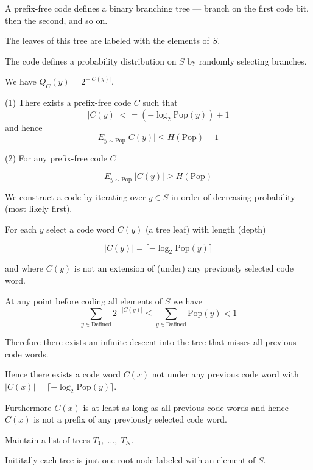 {

A prefix-free code defines a binary branching tree --- branch on the first code bit, then the second, and so on.

\vfill
The leaves of this tree are labeled with the elements of $S$.

\vfill
The code defines a probability distribution on $S$ by randomly selecting branches.

\vfill
We have $Q_C(y) = 2^{-|C(y)|}$.


(1) There exists a prefix-free code $C$ such that
$$|C(y)| <= (- \log_2 \mathrm{Pop}(y)) + 1$$
and hence
$$E_{y\sim \mathrm{Pop}} |C(y)| \leq H(\mathrm{Pop}) +1$$

\vfill
(2) For any prefix-free code $C$

$$E_{y \sim \mathrm{Pop}}\;|C(y)| \geq H(\mathrm{Pop})$$


\vfill
We construct a code by iterating over $y \in S$ in order of decreasing probability (most likely first).

\vfill
For each $y$ select a code word $C(y)$ (a tree leaf) with length (depth)

\vfill
$$|C(y)| = \lceil - \log_2 \mathrm{Pop}(y)\rceil$$

\vfill
and where $C(y)$ is not an extension of (under) any previously selected code word.


At any point before coding all elements of $S$ we have
$$\sum_{y \in \mathrm{Defined}} 2^{-|C(y)|} \leq \sum_{y \in \mathrm{Defined}} \mathrm{Pop}(y) < 1$$

\vfill
Therefore there exists an infinite descent into the tree that misses all previous code words.

\vfill
Hence there exists a code word $C(x)$ not under any previous code word with
$|C(x)| = \lceil - \log_2 \mathrm{Pop}(y)\rceil$.

\vfill
Furthermore $C(x)$ is at least as long as all previous code words and hence $C(x)$ is not a prefix of any previously selected code word.


Maintain a list of trees $T_1,\;\dots,\;T_N$.

\vfill
Inititally each tree is just one root node labeled with an element of $S$.

}
